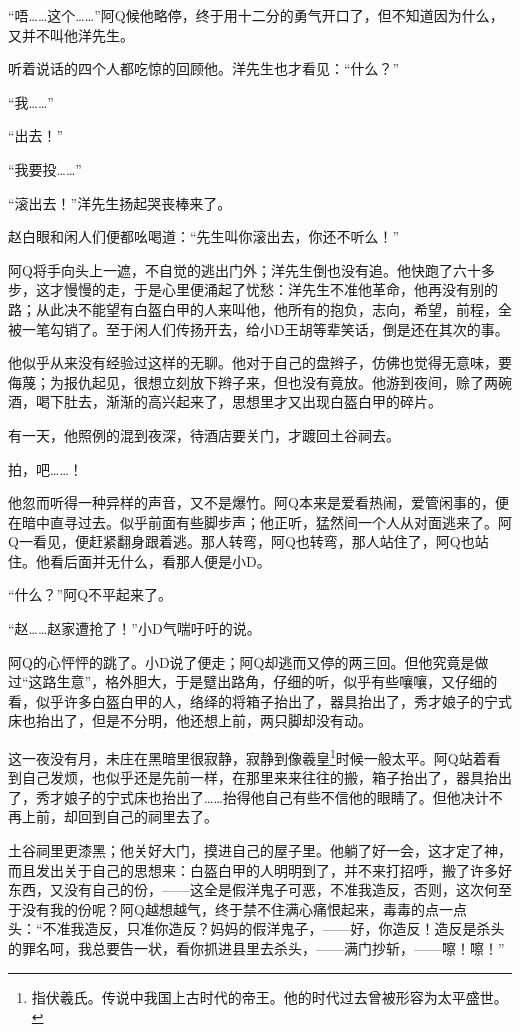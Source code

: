 \documentclass[12pt,UTF8]{ctexbook}
\begin{document}
“唔……这个……”阿Q候他略停，终于用十二分的勇气开口了，但不知道因为什么，又并不叫他洋先生。

听着说话的四个人都吃惊的回顾他。洋先生也才看见：“什么？”

“我……”

“出去！”

“我要投……”

“滚出去！”洋先生扬起哭丧棒来了。

赵白眼和闲人们便都吆喝道：“先生叫你滚出去，你还不听么！”

阿Q将手向头上一遮，不自觉的逃出门外；洋先生倒也没有追。他快跑了六十多步，这才慢慢的走，于是心里便涌起了忧愁：洋先生不准他革命，他再没有别的路；从此决不能望有白盔白甲的人来叫他，他所有的抱负，志向，希望，前程，全被一笔勾销了。至于闲人们传扬开去，给小D王胡等辈笑话，倒是还在其次的事。

他似乎从来没有经验过这样的无聊。他对于自己的盘辫子，仿佛也觉得无意味，要侮蔑；为报仇起见，很想立刻放下辫子来，但也没有竟放。他游到夜间，赊了两碗酒，喝下肚去，渐渐的高兴起来了，思想里才又出现白盔白甲的碎片。

有一天，他照例的混到夜深，待酒店要关门，才踱回土谷祠去。

拍，吧……！

他忽而听得一种异样的声音，又不是爆竹。阿Q本来是爱看热闹，爱管闲事的，便在暗中直寻过去。似乎前面有些脚步声；他正听，猛然间一个人从对面逃来了。阿Q一看见，便赶紧翻身跟着逃。那人转弯，阿Q也转弯，那人站住了，阿Q也站住。他看后面并无什么，看那人便是小D。

“什么？”阿Q不平起来了。

“赵……赵家遭抢了！”小D气喘吁吁的说。

阿Q的心怦怦的跳了。小D说了便走；阿Q却逃而又停的两三回。但他究竟是做过“这路生意”，格外胆大，于是躄出路角，仔细的听，似乎有些嚷嚷，又仔细的看，似乎许多白盔白甲的人，络绎的将箱子抬出了，器具抬出了，秀才娘子的宁式床也抬出了，但是不分明，他还想上前，两只脚却没有动。

这一夜没有月，未庄在黑暗里很寂静，寂静到像羲皇\footnote{指伏羲氏。传说中我国上古时代的帝王。他的时代过去曾被形容为太平盛世。}时候一般太平。阿Q站着看到自己发烦，也似乎还是先前一样，在那里来来往往的搬，箱子抬出了，器具抬出了，秀才娘子的宁式床也抬出了……抬得他自己有些不信他的眼睛了。但他决计不再上前，却回到自己的祠里去了。

土谷祠里更漆黑；他关好大门，摸进自己的屋子里。他躺了好一会，这才定了神，而且发出关于自己的思想来：白盔白甲的人明明到了，并不来打招呼，搬了许多好东西，又没有自己的份，——这全是假洋鬼子可恶，不准我造反，否则，这次何至于没有我的份呢？阿Q越想越气，终于禁不住满心痛恨起来，毒毒的点一点头：“不准我造反，只准你造反？妈妈的假洋鬼子，——好，你造反！造反是杀头的罪名呵，我总要告一状，看你抓进县里去杀头，——满门抄斩，——嚓！嚓！”
\end{document}
